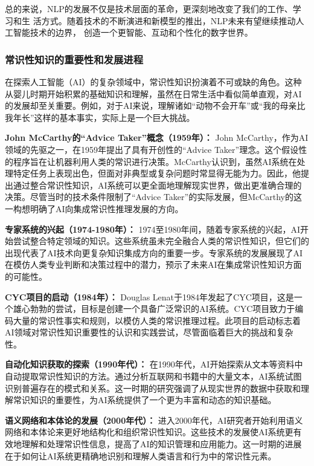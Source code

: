 总的来说，NLP的发展不仅是技术层面的革命，更深刻地改变了我们的工作、学习和生
活方式。随着技术的不断演进和新模型的推出，NLP未来有望继续推动人工智能技术的边界，
创造一个更智能、互动和个性化的数字世界。

\subsubsection{常识性知识的重要性和发展进程}

在探索人工智能（AI）的复杂领域中，常识性知识扮演着不可或缺的角色。这种从婴儿时期开始积累的基础知识和理解，虽然在日常生活中看似简单直观，对AI的发展却至关重要。例如，对于AI来说，理解诸如``动物不会开车''或``我的母亲比我年长''这样的基本事实，实际上是一个巨大挑战。


\textbf{John McCarthy的``Advice Taker''概念（1959年）：}
John McCarthy，作为AI领域的先驱之一，在1959年提出了具有开创性的``Advice Taker''理念。这个假设性的程序旨在让机器利用人类的常识进行决策。McCarthy认识到，虽然AI系统在处理特定任务上表现出色，但面对非典型或复杂问题时常显得无能为力。因此，他提出通过整合常识性知识，AI系统可以更全面地理解现实世界，做出更准确合理的决策。尽管当时的技术条件限制了``Advice Taker''的实际发展，但McCarthy的这一构想明确了AI向集成常识性推理发展的方向。

\textbf{专家系统的兴起（1974-1980年）：}
1974至1980年间，随着专家系统的兴起，AI开始尝试整合特定领域的知识。这些系统虽未完全融合人类的常识性知识，但它们的出现代表了AI技术向更复杂知识集成方向的重要一步。专家系统的发展展现了AI在模仿人类专业判断和决策过程中的潜力，预示了未来AI在集成常识性知识方面的可能性。

\textbf{CYC项目的启动（1984年）：}
Douglas Lenat于1984年发起了CYC项目，这是一个雄心勃勃的尝试，目标是创建一个具备广泛常识的AI系统。CYC项目致力于编码大量的常识性事实和规则，以模仿人类的常识推理过程。此项目的启动标志着AI领域对常识性知识重要性的认识和实践尝试，尽管面临着巨大的挑战和复杂性。

\textbf{自动化知识获取的探索（1990年代）：}
在1990年代，AI开始探索从文本等资料中自动提取常识性知识的方法。通过分析互联网和书籍中的大量文本，AI系统试图识别普遍存在的模式和关系。这一时期的研究强调了从现实世界的数据中获取和理解常识知识的重要性，为AI系统提供了一个更为丰富和动态的知识基础。

\textbf{语义网络和本体论的发展（2000年代）：}
进入2000年代，AI研究者开始利用语义网络和本体论来更好地结构化和组织常识性知识。这些技术的发展使AI系统更有效地理解和处理常识性信息，提高了AI的知识管理和应用能力。这一时期的进展在于如何让AI系统更精确地识别和理解人类语言和行为中的常识性元素。

